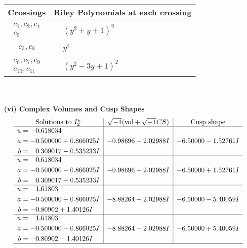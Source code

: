\documentclass[1p]{elsarticle_modified}
\theoremstyle{definition}
\newcommand{\I}{\sqrt{-1}}
\begin{document}
\begin{tabular}{m{50pt}|m{274pt}}
Crossings & \hspace{64pt}Riley Polynomials at each crossing \\
\hline $$\begin{aligned}c_{1},c_{2},c_{4}\\c_{5}\end{aligned}$$&$\begin{aligned}
&(y^2+y+1)^2
\end{aligned}$\\
\hline $$\begin{aligned}c_{3},c_{8}\end{aligned}$$&$\begin{aligned}
&y^4
\end{aligned}$\\
\hline $$\begin{aligned}c_{6},c_{7},c_{9}\\c_{10},c_{11}\end{aligned}$$&$\begin{aligned}
&(y^2-3 y+1)^2
\end{aligned}$\\
\hline
\end{tabular}\\~\\
\newpage\flushleft \textbf{(vi) Complex Volumes and Cusp Shapes}
$$\begin{array}{c|c|c}  
\text{Solutions to }I^u_{2}& \I (\text{vol} + \sqrt{-1}CS) & \text{Cusp shape}\\
 \hline 
\begin{aligned}
u &= -0.618034\phantom{ +0.000000I} \\
a &= -0.500000 + 0.866025 I \\
b &= \phantom{-}0.309017 - 0.535233 I\end{aligned}
 & -0.98696 + 2.02988 I & -6.50000 - 1.52761 I \\ \hline\begin{aligned}
u &= -0.618034\phantom{ +0.000000I} \\
a &= -0.500000 - 0.866025 I \\
b &= \phantom{-}0.309017 + 0.535233 I\end{aligned}
 & -0.98696 - 2.02988 I & -6.50000 + 1.52761 I \\ \hline\begin{aligned}
u &= \phantom{-}1.61803\phantom{ +0.000000I} \\
a &= -0.500000 + 0.866025 I \\
b &= -0.80902 + 1.40126 I\end{aligned}
 & -8.88264 + 2.02988 I & -6.50000 - 5.40059 I \\ \hline\begin{aligned}
u &= \phantom{-}1.61803\phantom{ +0.000000I} \\
a &= -0.500000 - 0.866025 I \\
b &= -0.80902 - 1.40126 I\end{aligned}
 & -8.88264 - 2.02988 I & -6.50000 + 5.40059 I\\
 \hline 
 \end{array}$$\newpage
\end{document}
